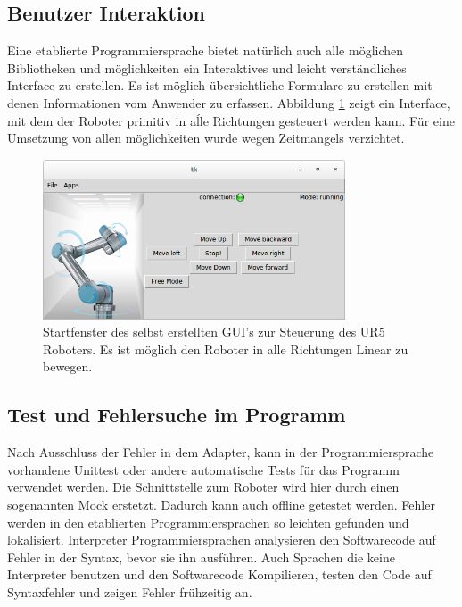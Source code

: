 \subsection{Benutzer Interaktion}
\label{user_interaktion_mit_hoerherer_schicht}

Eine etablierte Programmiersprache bietet natürlich auch alle möglichen Bibliotheken und möglichkeiten ein Interaktives und leicht verständliches Interface zu erstellen. Es ist möglich übersichtliche Formulare zu erstellen mit denen Informationen vom Anwender zu erfassen. Abbildung \ref{fig:hda_urcontrol_gui} zeigt ein Interface, mit dem der Roboter primitiv in aĺle Richtungen gesteuert werden kann. Für eine Umsetzung von allen möglichkeiten wurde wegen Zeitmangels verzichtet.

\begin{figure}[H]
  \centering
    \includegraphics[width=0.8\textwidth]{pic/hda_urcontrol_gui.png}
      \caption[Selbsterstelltes GUI zur Steuerung des UR5 Roboters]{Startfenster des selbst erstellten GUI's zur Steuerung des UR5 Roboters. Es ist möglich den Roboter in alle Richtungen Linear zu bewegen.}
      \label{fig:hda_urcontrol_gui}
\end{figure}

\subsection{Test und Fehlersuche im Programm}
\label{debuggen_mit_hoeherer schicht}

Nach Ausschluss der Fehler in dem Adapter, kann in der Programmiersprache vorhandene Unittest oder andere automatische Tests für das Programm verwendet werden. Die Schnittstelle zum Roboter wird hier durch einen sogenannten \ac{Mock} erstetzt. Dadurch kann auch offline getestet werden. Fehler werden in den etablierten Programmiersprachen so leichten gefunden und lokalisiert. \ac{Interpreter} Programmiersprachen analysieren den Softwarecode auf Fehler in der Syntax, bevor sie ihn ausführen. Auch Sprachen die keine \ac{Interpreter} benutzen und den Softwarecode Kompilieren, testen den Code auf Syntaxfehler und zeigen Fehler frühzeitig an.

